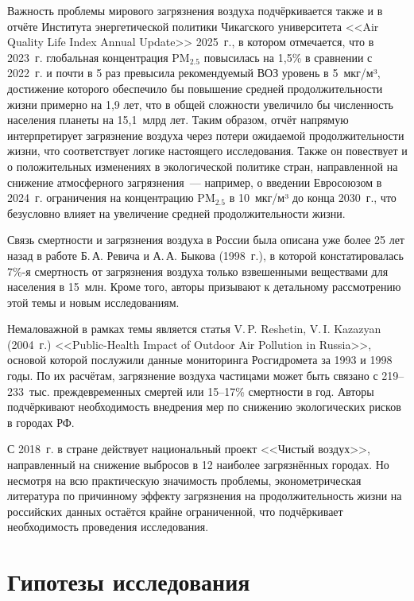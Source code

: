 \documentclass[10pt,a4paper]{article}
\begin{document}
\medskip

Важность проблемы мирового загрязнения воздуха подчёркивается также и в отчёте Института энергетической политики Чикагского университета <<Air Quality Life Index Annual Update>> 2025~г., в котором отмечается, что в 2023~г. глобальная концентрация $\text{PM}_{2.5}$ повысилась на 1{,}5\% в сравнении с 2022~г. и почти в 5 раз превысила рекомендуемый ВОЗ уровень в 5~мкг/м³, достижение которого обеспечило бы повышение средней продолжительности жизни примерно на 1{,}9 лет, что в общей сложности увеличило бы численность населения планеты на 15{,}1~млрд лет. Таким образом, отчёт напрямую интерпретирует загрязнение воздуха через потери ожидаемой продолжительности жизни, что соответствует логике настоящего исследования. Также он повествует и о положительных изменениях в экологической политике стран, направленной на снижение атмосферного загрязнения~--- например, о введении Евросоюзом в 2024~г. ограничения на концентрацию $\text{PM}_{2.5}$ в 10~мкг/м³ до конца 2030~г., что безусловно влияет на увеличение средней продолжительности жизни.

\medskip

Связь смертности и загрязнения воздуха в России была описана уже более 25 лет назад в работе Б.\,А. Ревича и А.\,А. Быкова (1998~г.), в которой констатировалась 7\%-я смертность от загрязнения воздуха только взвешенными веществами для населения в 15~млн. Кроме того, авторы призывают к детальному рассмотрению этой темы и новым исследованиям.

Немаловажной в рамках темы является статья V.\,P. Reshetin, V.\,I. Kazazyan (2004~г.) <<Public-Health Impact of Outdoor Air Pollution in Russia>>, основой которой послужили данные мониторинга Росгидромета за 1993 и 1998 годы. По их расчётам, загрязнение воздуха частицами может быть связано с 219--233~тыс. преждевременных смертей или 15--17\% смертности в год. Авторы подчёркивают необходимость внедрения мер по снижению экологических рисков в городах РФ.

\medskip

С 2018~г. в стране действует национальный проект <<Чистый воздух>>, направленный на снижение выбросов в 12 наиболее загрязнённых городах. Но несмотря на всю практическую значимость проблемы, эконометрическая литература по причинному эффекту загрязнения на продолжительность жизни на российских данных остаётся крайне ограниченной, что подчёркивает необходимость проведения исследования.

\section*{Гипотезы исследования}
\end{document}

